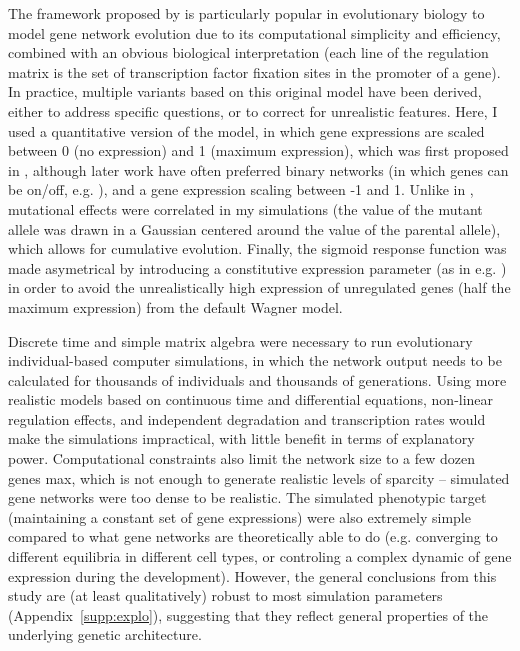 \documentclass[10pt,a4paper]{article}
\newcommand{\SupMat}{Appendix~}
\begin{document}
The framework proposed by \citep{Wag94,Wag96} is particularly popular in evolutionary biology to model gene network evolution due to its computational simplicity and efficiency, combined with an obvious biological interpretation (each line of the regulation matrix is the set of transcription factor fixation sites in the promoter of a gene). In practice, multiple variants based on this original model have been derived, either to address specific questions, or to correct for unrealistic features. Here, I used a quantitative version of the model, in which gene expressions are scaled between 0 (no expression) and 1 (maximum expression), which was first proposed in \citep{Wag94}, although later work have often preferred  binary networks (in which genes can be on/off, e.g. \citep{Wag96,CMW07}), and a gene expression scaling between -1 and 1. Unlike in \citealp{Wag96, SB02}, mutational effects were correlated in my simulations (the value of the mutant allele was drawn in a Gaussian centered around the value of the parental allele), which allows for cumulative evolution. Finally, the sigmoid response function was made asymetrical by introducing a constitutive expression parameter (as in e.g. \citealp{RL16}) in order to avoid the unrealistically high expression of unregulated genes (half the maximum expression) from the default Wagner model. 

Discrete time and simple matrix algebra were necessary to run evolutionary individual-based computer simulations, in which the network output needs to be calculated for thousands of individuals and thousands of generations. Using more realistic models based on continuous time and differential equations, non-linear regulation effects, and independent degradation and transcription rates would make the simulations impractical, with little benefit in terms of explanatory power. Computational constraints also limit the network size to a few dozen genes max, which is not enough to generate realistic levels of sparcity -- simulated gene networks were too dense to be realistic. The simulated phenotypic target (maintaining a constant set of gene expressions) were also extremely simple compared to what gene networks are theoretically able to do (e.g. converging to different equilibria in different cell types, or controling a complex dynamic of gene expression during the development). However, the general conclusions from this study are (at least qualitatively) robust to most simulation parameters (\SupMat \ref{supp:explo}), suggesting that they reflect general properties of the underlying genetic architecture. 
\end{document}
